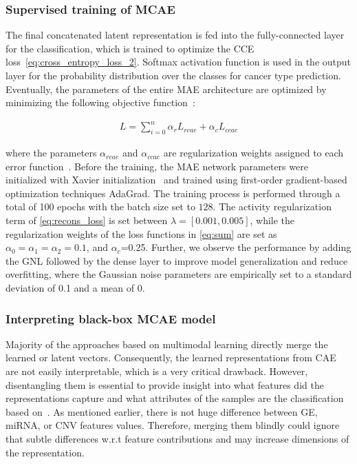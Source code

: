 \subsubsection{Supervised training of MCAE}
The final concatenated latent representation is fed into the fully-connected layer for the classification, which is trained to optimize the CCE loss~\cref{eq:cross_entropy_loss_2}. Softmax activation function is used in the output layer for the probability distribution over the classes for cancer type prediction. Eventually, the parameters of the entire MAE  architecture are optimized by minimizing the following objective function~\cite{mmdcae}:

\vspace{-4mm}
\begin{align}
    {L}=\sum_{i=0}^{n} \alpha_{r} {L}_{rcae}+\alpha_{c} {L}_{ccae}
    \label{eq:sum_2}
\end{align}

\hspace*{3.5mm} where the parameters $\alpha_{rcae}$ and $\alpha_{ccae}$ are regularization weights assigned to each error function~\cite{mmdcae}. Before the training, the MAE network parameters were initialized with Xavier initialization~\cite{xavier} and trained using first-order gradient-based optimization techniques AdaGrad. The training process is performed through a total of 100 epochs with the batch size set to $128$. The activity regularization term of \cref{eq:recons_loss} is set between $\lambda=[0.001, 0.005]$, while the regularization weights of the loss functions in \cref{eq:sum} are set as  $\alpha_{0}=\alpha_{1}=\alpha_{2}=0.1$, and $\alpha_{c}$=0.25. %
Further, we observe the performance by adding the GNL followed by the dense layer to improve model generalization and reduce overfitting, where the Gaussian noise parameters are empirically set to a standard deviation of 0.1 and a mean of 0. 

\subsubsection{Interpreting black-box MCAE model}
Majority of the approaches based on multimodal learning directly merge the learned or latent vectors. Consequently, the learned representations from CAE are not easily interpretable, which is a very critical drawback. However, disentangling them is essential to provide insight into what features did the representations capture and what attributes of the samples are the classification based on~\cite{karimTCBB2020}. As mentioned earlier, there is not huge difference between GE, miRNA, or CNV features values. Therefore, merging them blindly could ignore that subtle differences w.r.t feature contributions and may increase dimensions of the representation. 

